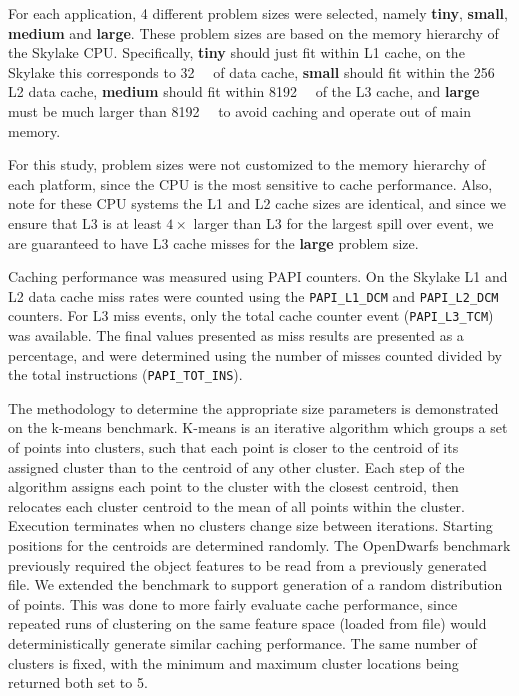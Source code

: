 \documentclass[../document.tex]{subfiles}
\begin{document}
\label{ssec:setting_sizes}

For each application, 4 different problem sizes were selected, namely {\bf tiny}, {\bf small}, {\bf medium} and {\bf large}.
These problem sizes are based on the memory hierarchy of the Skylake CPU.
Specifically, {\bf tiny} should just fit within L1 cache, on the Skylake this corresponds to \SI{32}{\kibi\byte} of data cache, {\bf small} should fit within the \SI{256}{\kibi\byte} L2 data cache, {\bf medium} should fit within \SI{8192}{\kibi\byte} of the L3 cache, and {\bf large} must be much larger than \SI{8192}{\kibi\byte} to avoid caching and operate out of main memory.

For this study, problem sizes were not customized to the memory hierarchy of each platform, since the CPU is the most sensitive to cache performance.
Also, note for these CPU systems the L1 and L2 cache sizes are identical, and since we ensure that L3 is at least $4\times$ larger than L3 for the largest spill over event, we are guaranteed to have L3 cache misses for the {\bf large} problem size.

Caching performance was measured using PAPI counters.
On the Skylake L1 and L2 data cache miss rates were counted using the {\tt PAPI\_L1\_DCM} and {\tt PAPI\_L2\_DCM} counters.
For L3 miss events, only the total cache counter event ({\tt PAPI\_L3\_TCM}) was available.
The final values presented as miss results are presented as a percentage, and were determined using the number of misses counted divided by the total instructions ({\tt PAPI\_TOT\_INS}).

The methodology to determine the appropriate size parameters is demonstrated on the k-means benchmark.
K-means is an iterative algorithm which groups a set of points into clusters, such that each point is closer to the centroid of its assigned cluster than to the centroid of any other cluster.
Each step of the algorithm assigns each point to the cluster with the closest centroid, then relocates each cluster centroid to the mean of all points within the cluster.
Execution terminates when no clusters change size between iterations.
Starting positions for the centroids are determined randomly.
The OpenDwarfs benchmark previously required the object features to be read from a previously generated file.
We extended the benchmark to support generation of a random distribution of points.
This was done to more fairly evaluate cache performance, since repeated runs of clustering on the same feature space (loaded from file) would deterministically generate similar caching performance.
The same number of clusters is fixed, with the minimum and maximum cluster locations being returned both set to 5.
\end{document}
